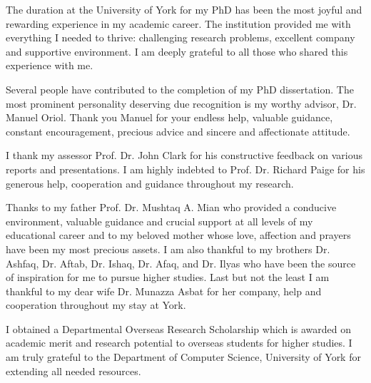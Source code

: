 \begin{acknowledgements}
The duration at the University of York for my PhD has been the most joyful and rewarding experience in my academic career. The institution provided me with everything I needed to thrive: challenging research problems, excellent company and supportive environment. I am deeply grateful to all those who shared this experience with me. 

Several people have contributed to the completion of my PhD dissertation. The most prominent personality deserving due recognition is my worthy advisor, Dr. Manuel Oriol. Thank you Manuel for your endless help, valuable guidance, constant encouragement, precious advice and sincere and affectionate attitude.

I thank my assessor Prof. Dr. John Clark for his constructive feedback on various reports and presentations. I am highly indebted to Prof. Dr. Richard Paige for his generous help, cooperation and guidance throughout my research.

Thanks to my father Prof. Dr. Mushtaq A. Mian who provided a conducive environment, valuable guidance and crucial support at all levels of my educational career and to my beloved mother whose love, affection and prayers have been my most precious assets. I am also thankful to my brothers Dr. Ashfaq, Dr. Aftab, Dr. Ishaq, Dr. Afaq, and Dr. Ilyas who have been the source of inspiration for me to pursue higher studies. Last but not the least I am thankful to my dear wife Dr. Munazza Asbat for her company, help and cooperation throughout my stay at York.

I obtained a Departmental Overseas Research Scholarship which is awarded on academic merit and research potential to overseas students for higher studies. I am truly grateful to the Department of Computer Science, University of York for extending all needed resources.
\end{acknowledgements}